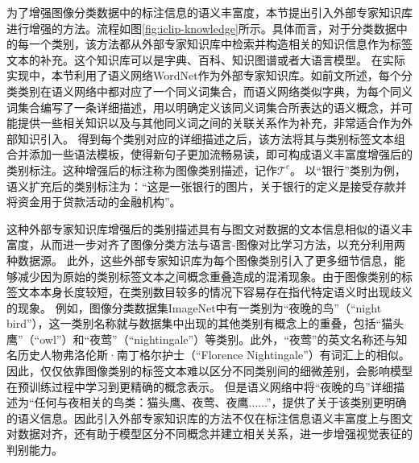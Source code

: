 为了增强图像分类数据中的标注信息的语义丰富度，本节提出引入外部专家知识库进行增强的方法。流程如图\ref{fig:iclip-knowledge}所示。具体而言，对于分类数据中的每一个类别，该方法都从外部专家知识库中检索并构造相关的知识信息作为标签文本的补充。这个知识库可以是字典、百科、知识图谱或者大语言模型。
在实际实现中，本节利用了语义网络WordNet作为外部专家知识库。如前文所述，每个分类类别在语义网络中都对应了一个同义词集合，而语义网络类似字典，为每个同义词集合编写了一条详细描述，用以明确定义该同义词集合所表达的语义概念，并可能提供一些相关知识以及与其他同义词之间的关联关系作为补充，非常适合作为外部知识引入。
得到每个类别对应的详细描述之后，该方法将其与类别标签文本组合并添加一些语法模板，使得新句子更加流畅易读，即可构成语义丰富度增强后的类别标注。这种增强后的标注称为图像类别描述，记作$\mathcal{T}^{c}$。
以“银行”类别为例，语义扩充后的类别标注为：“这是一张银行的图片，关于银行的定义是接受存款并将资金用于贷款活动的金融机构”。


 这种外部专家知识库增强后的类别描述具有与图文对数据的文本信息相似的语义丰富度，从而进一步对齐了图像分类方法与语言-图像对比学习方法，以充分利用两种数据源。
 此外，这些外部专家知识库为每个图像类别引入了更多细节信息，能够减少因为原始的类别标签文本之间概念重叠造成的混淆现象。由于图像类别的标签文本本身长度较短，在类别数目较多的情况下容易存在指代特定语义时出现歧义的现象。
 例如，图像分类数据集ImageNet中有一类别为“夜晚的鸟”（“night bird”），这一类别名称就与数据集中出现的其他类别有概念上的重叠，包括“猫头鹰”（“owl”）和“夜莺”（“nightingale”）等类别。此外，“夜莺”的英文名称还与知名历史人物弗洛伦斯·南丁格尔护士（“Florence Nightingale”）有词汇上的相似。
 因此，仅仅依靠图像类别的标签文本难以区分不同类别间的细微差别，会影响模型在预训练过程中学习到更精确的概念表示。
 但是语义网络中将“夜晚的鸟”详细描述为“任何与夜相关的鸟类：猫头鹰、夜莺、夜鹰......”，提供了关于该类别更明确的语义信息。因此引入外部专家知识库的方法不仅在标注信息语义丰富度上与图文对数据对齐，还有助于模型区分不同概念并建立相关关系，进一步增强视觉表征的判别能力。


